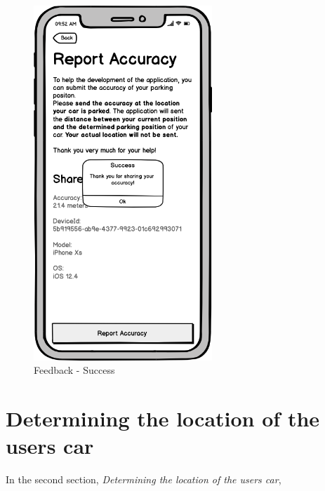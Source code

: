 \begin{figure}[h]
\begin{minipage}[b]{0.49\textwidth}
    \includegraphics[width=0.6\textwidth]{images/UI/Iteration4-Feedback-Success.png}
    \caption{Feedback - Success}
    \label{fig:feedback-succ}
  \end{minipage}
\end{figure}



\section{Determining the location of the users car}
In the second section, \textit{Determining the location of the users car}, 
